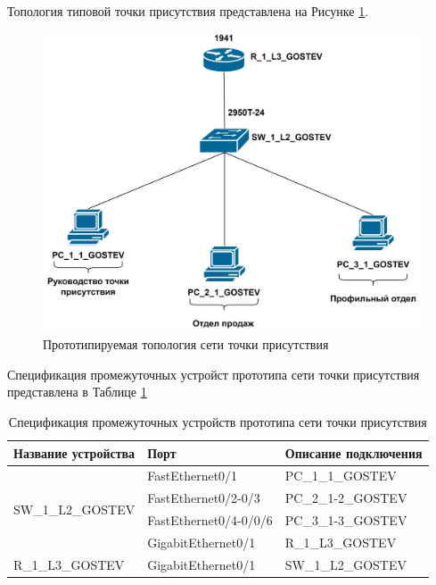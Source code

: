 \documentclass[14pt, a4paper]{extarticle}
\numberwithin{equation}{section}
\begin{document}
Топология типовой точки присутствия представлена на Рисунке \ref{fig:tpTopo}.
\begin{figure}[H]
        \centering
        \includegraphics[scale=0.2]{topo_tp.png}
        \caption{Прототипируемая топология сети точки присутствия}
        \label{fig:tpTopo}
\end{figure}

Спецификация промежуточных устройст прототипа сети точки присутствия
представлена в Таблице \ref{table:tpDevicesSpecs}
\begin{table}[H]
\small
\centering
\caption{Спецификация промежуточных устройств прототипа сети точки присутствия}
\label{table:tpDevicesSpecs}
\begin{tabular}{|l|l|l|}
\hline
\textbf{Название устройства}       & \textbf{Порт}         & \textbf{Описание подключения} \\ \hline
\multirow{4}{*}{SW\_1\_L2\_GOSTEV} & FastEthernet0/1       & PC\_1\_1\_GOSTEV              \\ \cline{2-3} 
                                   & FastEthernet0/2-0/3   & PC\_2\_1-2\_GOSTEV        \\ \cline{2-3} 
                                   & FastEthernet0/4-0/0/6 & PC\_3\_1-3\_GOSTEV            \\ \cline{2-3} 
                                   & GigabitEthernet0/1    & R\_1\_L3\_GOSTEV              \\ \hline
R\_1\_L3\_GOSTEV                   & GigabitEthernet0/1    & SW\_1\_L2\_GOSTEV             \\ \hline
\end{tabular}
\end{table}
\end{document}
